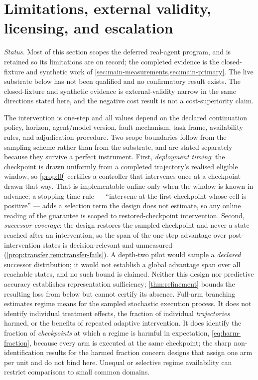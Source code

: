 \section{Limitations, external validity, licensing, and escalation}
\label{sec:limitations}

\emph{Status.} Most of this section scopes the deferred real-agent program, and
is retained so its limitations are on record; the completed evidence is the
closed-fixture and synthetic work of \cref{sec:main-measurements,sec:main-primary}.
The live substrate below has not been qualified and no confirmatory result
exists.  The closed-fixture and synthetic evidence is external-validity narrow in
the same directions stated here, and the negative cost result is not a
cost-superiority claim.

The intervention is one-step and all values depend on the declared continuation
policy, horizon, agent/model version, fault mechanism, task frame, availability
rules, and adjudication procedure.  Two scope boundaries follow from the
sampling scheme rather than from the substrate, and are stated separately
because they survive a perfect instrument.  First, \emph{deployment timing}: the
checkpoint is drawn uniformly from a completed trajectory's realised eligible
window, so \cref{prop:l0} certifies a controller that intervenes once at a
checkpoint drawn that way.  That is implementable online only when the window is
known in advance; a stopping-time rule --- ``intervene at the first checkpoint
whose cell is positive'' --- adds a selection term the design does not estimate,
so any online reading of the guarantee is scoped to restored-checkpoint
intervention.  Second, \emph{successor coverage}: the design restores the
sampled checkpoint and never a state reached after an intervention, so the span
of the one-step advantage over post-intervention states is decision-relevant and
unmeasured (\cref{prop:transfer,rem:transfer-fails}).  A depth-two pilot would
sample a \emph{declared} successor distribution; it would not establish a global
advantage span over all reachable states, and no such bound is claimed.  Neither this design nor predictive accuracy
establishes representation sufficiency; \cref{thm:refinement} bounds the
resulting loss from below but cannot certify its absence.  Full-arm branching
estimates regime means for the sampled stochastic execution process.  It does
not identify individual treatment effects, the fraction of individual
\emph{trajectories} harmed, or the benefits of repeated adaptive intervention.
It does identify the fraction of \emph{checkpoints} at which a regime is harmful
in expectation, \eqref{eq:harm-fraction}, because every arm is executed at the
same checkpoint; the sharp non-identification results for the harmed fraction
concern designs that assign one arm per unit and do not bind here.  Unequal or
selective regime availability can restrict comparisons to small common domains.

